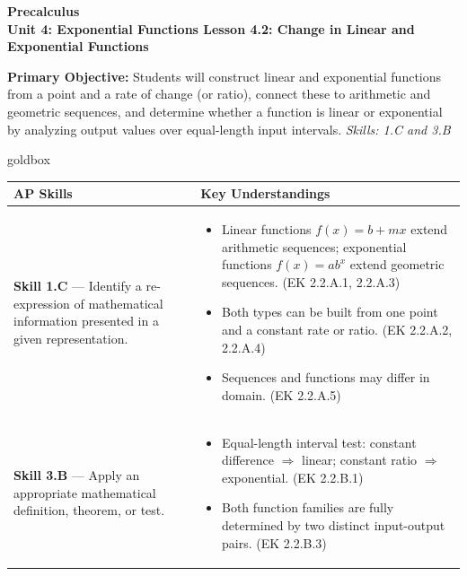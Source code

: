 \documentclass[10pt]{article}
\newcommand{\CourseName}{Precalculus}
\newcommand{\UnitNumberName}{Unit 4: Exponential Functions \quad}
\newcommand{\LessonNumberName}{Lesson 4.2: Change in Linear and Exponential Functions}
\begin{document}
\begin{center}
    {\Large\bfseries \CourseName \\
    {\small\bfseries \UnitNumberName \LessonNumberName}}
\end{center}

\begin{tcolorbox}[colback=sky, colframe=navy, boxrule=0.9pt, arc=2mm,
    left=2mm, right=2mm, top=1.5mm, bottom=1.5mm]
    \textbf{Primary Objective:} Students will construct linear and exponential functions from a
    point and a rate of change (or ratio), connect these to arithmetic and geometric sequences,
    and determine whether a function is linear or exponential by analyzing output values over
    equal-length input intervals.
    \hfill\textit{\small Skills: 1.C and 3.B}
\end{tcolorbox}

\renewcommand{\arraystretch}{1.6}
\begin{skillbox}{goldbox}
\begin{tabularx}{\linewidth}{@{}X X@{}}
\textbf{AP Skills} &
\textbf{Key Understandings} \\
\midrule
\textbf{Skill 1.C} --- Identify a re-expression of mathematical information presented in a given representation. &
\begin{itemize}[leftmargin=1.2em,itemsep=2pt,topsep=0pt]
  \item Linear functions $f(x) = b + mx$ extend arithmetic sequences; exponential functions
        $f(x) = ab^x$ extend geometric sequences. (EK 2.2.A.1, 2.2.A.3)
  \item Both types can be built from one point and a constant rate or ratio.
        (EK 2.2.A.2, 2.2.A.4)
  \item Sequences and functions may differ in domain. (EK 2.2.A.5)
\end{itemize} \\
\textbf{Skill 3.B} --- Apply an appropriate mathematical definition, theorem, or test. &
\begin{itemize}[leftmargin=1.2em,itemsep=2pt,topsep=0pt]
  \item Equal-length interval test: constant difference $\Rightarrow$ linear; constant ratio
        $\Rightarrow$ exponential. (EK 2.2.B.1)
  \item Both function families are fully determined by two distinct input-output pairs.
        (EK 2.2.B.3)
\end{itemize} \\
\end{tabularx}
\end{skillbox}
\end{document}
